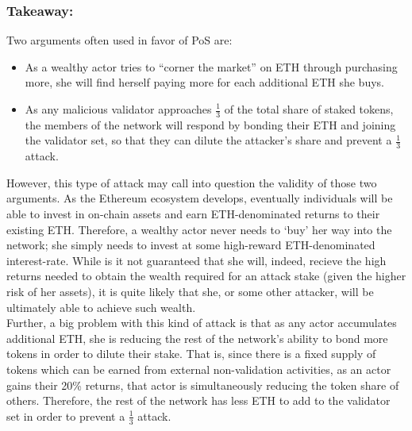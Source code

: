 \documentclass{article}
\renewcommand{\|}{\;|\;}
\begin{document}
\subsubsection*{Takeaway:}

Two arguments often used in favor of PoS are:
\begin{itemize}
    \item As a wealthy actor tries to “corner the market” on ETH  through purchasing more, she will find herself paying more for each additional ETH she buys. 
    \item As any malicious validator approaches $\frac{1}{3}$ of the total share of staked tokens, the members of the network will respond by bonding their ETH and joining the validator set, so that they can dilute the attacker’s share and prevent a $\frac{1}{3}$ attack.
\end{itemize}
However, this type of attack may call into question the validity of those two arguments. As the Ethereum ecosystem develops, eventually individuals will be able to invest in on-chain assets and earn ETH-denominated returns to their existing ETH. Therefore, a wealthy actor never needs to ‘buy’ her way into the network; she simply needs to invest at some high-reward ETH-denominated interest-rate. While is it not guaranteed that she will, indeed, recieve the high returns needed to obtain the wealth required for an attack stake (given the higher risk of her assets), it is quite likely that she, or some other attacker, will be ultimately able to achieve such wealth. \\ 

Further, a big problem with this kind of attack is that as any actor accumulates additional ETH, she is reducing the rest of the network’s ability to bond more tokens in order to dilute their stake. That is, since there is a fixed supply of tokens which can be earned from external non-validation activities, as an actor gains their 20\% returns, that actor is simultaneously reducing the token share of others. Therefore, the rest of the network has less ETH to add to the validator set in order to prevent a $\frac{1}{3}$ attack.
\end{document}
